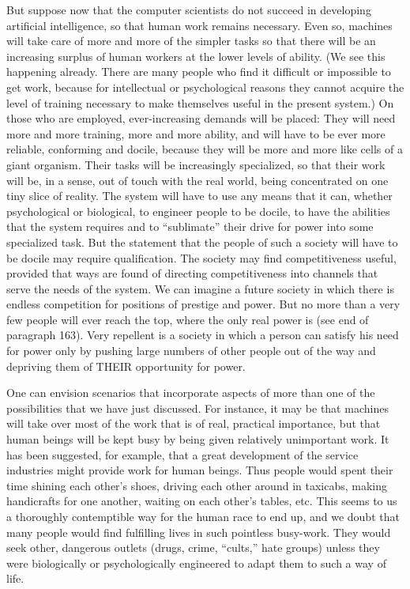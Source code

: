  But suppose now that the computer scientists do not succeed in developing artificial intelligence, so that human work remains necessary. Even so, machines will take care of more and more of the simpler tasks so that there will be an increasing surplus of human workers at the lower levels of ability. (We see this happening already. There are many people who find it difficult or impossible to get work, because for intellectual or psychological reasons they cannot acquire the level of training necessary to make themselves useful in the present system.) On those who are employed, ever-increasing demands will be placed: They will need more and more training, more and more ability, and will have to be ever more reliable, conforming and docile, because they will be more and more like cells of a giant organism. Their tasks will be increasingly specialized, so that their work will be, in a sense, out of touch with the real world, being concentrated on one tiny slice of reality. The system will have to use any means that it can, whether psychological or biological, to engineer people to be docile, to have the abilities that the system requires and to “sublimate” their drive for power into some specialized task. But the statement that the people of such a society will have to be docile may require qualification. The society may find competitiveness useful, provided that ways are found of directing competitiveness into channels that serve the needs of the system. We can imagine a future society in which there is endless competition for positions of prestige and power. But no more than a very few people will ever reach the top, where the only real power is (see end of paragraph 163). Very repellent is a society in which a person can satisfy his need for power only by pushing large numbers of other people out of the way and depriving them of THEIR opportunity for power.

 One can envision scenarios that incorporate aspects of more than one of the possibilities that we have just discussed. For instance, it may be that machines will take over most of the work that is of real, practical importance, but that human beings will be kept busy by being given relatively unimportant work. It has been suggested, for example, that a great development of the service industries might provide work for human beings. Thus people would spent their time shining each other’s shoes, driving each other around in taxicabs, making handicrafts for one another, waiting on each other’s tables, etc. This seems to us a thoroughly contemptible way for the human race to end up, and we doubt that many people would find fulfilling lives in such pointless busy-work. They would seek other, dangerous outlets (drugs, crime, “cults,” hate groups) unless they were biologically or psychologically engineered to adapt them to such a way of life.

